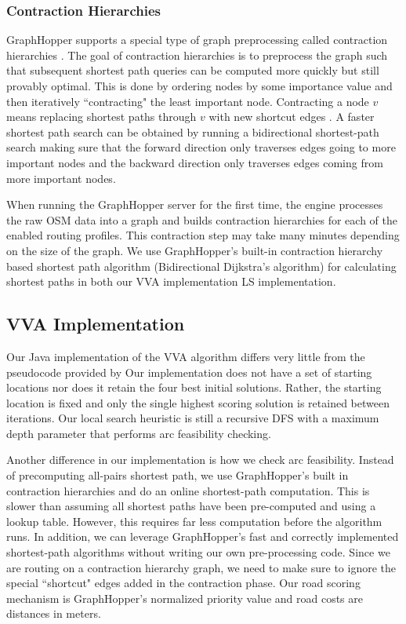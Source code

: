 \documentclass[11pt]{article}
\begin{document}
\subsubsection{Contraction Hierarchies}
GraphHopper supports a special type of graph preprocessing called contraction hierarchies \cite{graphhopper}. The goal of contraction hierarchies is to preprocess the graph such that subsequent shortest path queries can be computed more quickly but still provably optimal. This is done by ordering nodes by some importance value and then iteratively ``contracting" the least important node. Contracting a node $v$ means replacing shortest paths through $v$ with new shortcut edges \cite{geisberger2008contraction}. A faster shortest path search can be obtained by running a bidirectional shortest-path search making sure that the forward direction only traverses edges going to more important nodes and the backward direction only traverses edges coming from more important nodes.

When running the GraphHopper server for the first time, the engine processes the raw OSM data into a graph and builds contraction hierarchies for each of the enabled routing profiles. This contraction step may take many minutes depending on the size of the graph. We use GraphHopper's built-in contraction hierarchy based shortest path algorithm (Bidirectional Dijkstra's algorithm) for calculating shortest paths in both our VVA implementation LS implementation.

\subsection{VVA Implementation}
Our Java implementation of the VVA algorithm differs very little from the pseudocode provided by \citeauthor{verbeeck2014extension} Our implementation does not have a set of starting locations nor does it retain the four best initial solutions. Rather, the starting location is fixed and only the single highest scoring solution is retained between iterations. Our local search heuristic is still a recursive DFS with a maximum depth parameter that performs arc feasibility checking.

Another difference in our implementation is how we check arc feasibility. Instead of precomputing all-pairs shortest path, we use GraphHopper's built in contraction hierarchies and do an online shortest-path computation. This is slower than assuming all shortest paths have been pre-computed and using a lookup table. However, this requires far less computation before the algorithm runs. In addition, we can leverage GraphHopper's fast and correctly implemented shortest-path algorithms without writing our own pre-processing code. Since we are routing on a contraction hierarchy graph, we need to make sure to ignore the special ``shortcut" edges added in the contraction phase. Our road scoring mechanism is GraphHopper's normalized priority value and road costs are distances in meters.
\end{document}
